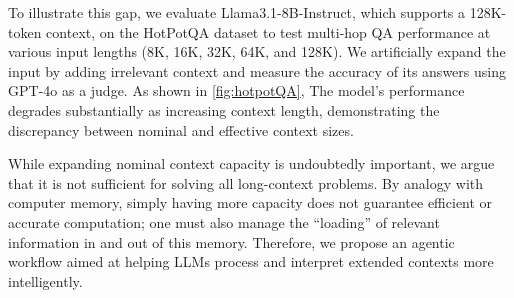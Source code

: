 
To illustrate this gap, we evaluate Llama3.1-8B-Instruct, which supports a 128K-token context, on the HotPotQA dataset to test multi-hop QA performance at various input lengths (8K, 16K, 32K, 64K, and 128K). We artificially expand the input by adding irrelevant context and measure the accuracy of its answers  using GPT-4o as a judge. As shown in \cref{fig:hotpotQA}, The model’s performance degrades substantially as increasing context length, demonstrating the discrepancy between nominal and effective context sizes.



While expanding nominal context capacity is undoubtedly important, we argue that it is not sufficient for solving all long-context problems. By analogy with computer memory, simply having more capacity does not guarantee efficient or accurate computation; one must also manage the ``loading'' of relevant information in and out of this memory. Therefore, we propose an agentic workflow aimed at helping LLMs process and interpret extended contexts more intelligently. 




